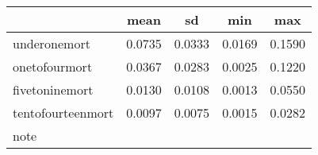 \begin{tabular}{l*{1}{cccc}}
\hline\hline
            &        mean&          sd&         min&         max\\
\hline
underonemort&      0.0735&      0.0333&      0.0169&      0.1590\\
onetofourmort&      0.0367&      0.0283&      0.0025&      0.1220\\
fivetoninemort&      0.0130&      0.0108&      0.0013&      0.0550\\
tentofourteenmort&      0.0097&      0.0075&      0.0015&      0.0282\\
\hline\hline
\multicolumn{5}{l}{\footnotesize note}\\
\end{tabular}
